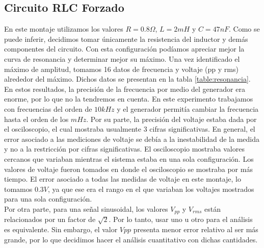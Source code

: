 \documentclass[%
 reprint,
 amsmath,amssymb,
 aps,
]{revtex4-1}
\begin{document}
{\subsection{\label{sec:level2}Circuito RLC Forzado}
En este montaje utilizamos los valores $R = 0.8\Omega$, $L = 2mH$ y $C = 47nF$. Como se puede inferir, decidimos tomar \'unicamente la resistencia del inductor y dem\'as componentes del circuito. Con esta configuraci\'on pod\'iamos apreciar mejor la curva de resonancia y determinar mejor su m\'aximo. Una vez identificado el m\'aximo de amplitud, tomamos 16 datos de frecuencia y voltaje (pp y rms) alrededor del m\'aximo. Dichos datos se presentan en la tabla \ref{table:resonancia}. \\

En estos resultados, la precisi\'on de la frecuencia por medio del generador era enorme, por lo que no la tendremos en cuenta. En este experimento trabajamos con frecuencias del orden de $10kHz$ y el generador permit\'ia cambiar la frecuencia hasta el orden de los $mHz$. Por su parte, la precisi\'on del voltaje estaba dada por el osciloscopio, el cual mostraba usualmente 3 cifras significativas. En general, el error asociado a las mediciones de voltaje se deb\'ia a la inestabilidad de la medida y no a la restricci\'on por cifras significativas. El osciloscopio mostraba valores cercanos que variaban mientras el sistema estaba en una sola configuraci\'on. Los valores de voltaje fueron tomados en donde el osciloscopio se mostraba por m\'as tiempo. El error asociado a todas las medidas de voltaje en este montaje, lo tomamos $0.3V$, ya que ese era el rango en el que variaban los voltajes mostrados para una sola configuraci\'on.\\

Por otra parte, para una señal sinusoidal, los valores $V_{pp}$ y $V_{rms}$ est\'an relacionados por un factor de $\sqrt{2}$. Por lo tanto, usar uno u otro para el an\'alisis es equivalente. Sin embargo, el valor $V{pp}$ presenta menor error relativo al ser m\'as grande, por lo que decidimos hacer el an\'alisis cuantitativo con dichas cantidades.\\

}
\end{document}
